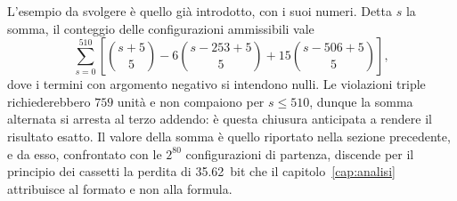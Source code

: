 L'esempio da svolgere è quello già introdotto, con i suoi numeri. Detta $s$ la somma, il conteggio delle configurazioni ammissibili vale
\begin{equation}
\sum_{s=0}^{510} \left[ \binom{s+5}{5} - 6\binom{s-253+5}{5} + 15\binom{s-506+5}{5} \right],
\end{equation}
dove i termini con argomento negativo si intendono nulli. Le violazioni triple richiederebbero $759$ unità e non compaiono per $s \le 510$, dunque la somma alternata si arresta al terzo addendo: è questa chiusura anticipata a rendere il risultato esatto. Il valore della somma è quello riportato nella sezione precedente, e da esso, confrontato con le $2^{80}$ configurazioni di partenza, discende per il principio dei cassetti la perdita di \SI{35,62}{bit} che il capitolo~\ref{cap:analisi} attribuisce al formato e non alla formula.
